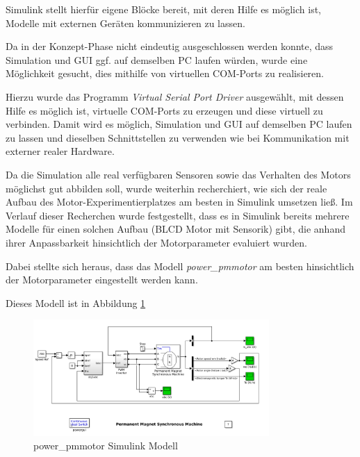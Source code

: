 Simulink stellt hierfür eigene Blöcke bereit, mit deren Hilfe es möglich ist, Modelle mit externen Geräten kommunizieren zu lassen.

Da in der Konzept-Phase nicht eindeutig ausgeschlossen werden konnte, dass Simulation und GUI ggf. auf demselben PC laufen würden, wurde eine Möglichkeit gesucht, dies mithilfe von virtuellen COM-Ports zu realisieren. 

Hierzu wurde das Programm \textit{Virtual Serial Port Driver} %
ausgewählt, mit dessen Hilfe es möglich ist, virtuelle COM-Ports zu erzeugen und diese virtuell zu verbinden. Damit wird es möglich, Simulation und GUI auf demselben PC laufen zu lassen und dieselben Schnittstellen zu verwenden wie bei Kommunikation mit externer realer Hardware.

Da die Simulation alle real verfügbaren Sensoren sowie das Verhalten des Motors möglichst gut abbilden soll, wurde weiterhin recherchiert, wie sich der reale Aufbau des Motor-Experimentierplatzes am besten in Simulink umsetzen ließ. Im Verlauf dieser Recherchen wurde festgestellt, dass es in Simulink bereits mehrere Modelle für einen solchen Aufbau (BLCD Motor mit Sensorik) gibt, die anhand ihrer Anpassbarkeit hinsichtlich der Motorparameter evaluiert wurden. 

Dabei stellte sich heraus, dass das Modell \textit{power\_pmmotor}
am besten hinsichtlich der Motorparameter eingestellt werden kann. 

Dieses Modell ist in Abbildung \ref{FigPowerPmmotor}
\begin{figure}[htbp]
	\centering
	\includegraphics[width=0.8\textwidth]{./sim/pictures/powerPmmotor.png}
	\caption{power\_pmmotor Simulink Modell}
	\label{FigPowerPmmotor}
\end{figure}

